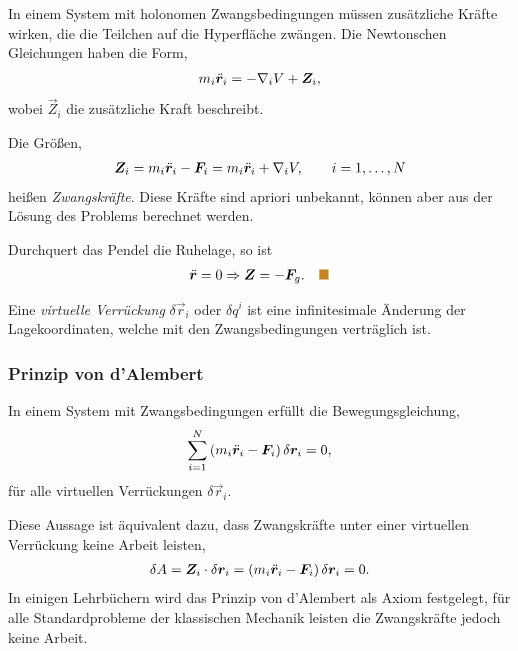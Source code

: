 \begin{bemn}
In einem System mit holonomen Zwangsbedingungen müssen zusätzliche Kräfte
wirken, die die Teilchen auf die Hyperfläche zwängen. Die Newtonschen Gleichungen haben die
Form,
\begin{align*}
m_i \ddot{\bm{r}}_i = -\nabla_i V + \bm{Z}_i,
\end{align*}
wobei $\vec{Z}_i$ die zusätzliche Kraft beschreibt.\maphere
\end{bemn}

\begin{defnn}
Die Größen,
\begin{align*}
\bm{Z}_i = m_i\ddot{\bm{r}}_i - \bm{F}_i = m_i\ddot{\bm{r}}_i + \nabla_i V,\qquad i =
1,\ldots,N
\end{align*}
heißen \emph{Zwangskräfte}. Diese Kräfte sind apriori unbekannt, können aber
aus der Lösung des Problems berechnet werden.\fishhere
\end{defnn}

\begin{bsp}
Durchquert das Pendel die Ruhelage, so ist
\begin{align*}
\ddvec{r} = 0 \Rightarrow \vec{Z} = -\vec{F}_g.\bsphere
\end{align*}
\end{bsp}

\begin{defnn}
Eine \emph{virtuelle Verrückung} $\delta \vec{r}_i$ oder $\delta q^i$ ist eine
infinitesimale Änderung der Lagekoordinaten, welche mit den Zwangsbedingungen
verträglich ist.\fishhere
\end{defnn}

\subsubsection{Prinzip von d'Alembert}
\begin{propn}
In einem System mit Zwangsbedingungen erfüllt die Bewegungsgleichung,
\begin{align*}
\sum\limits_{i=1}^N \left(m_i\ddot{\bm{r}}_i - \bm{F}_i \right)\delta\bm{r}_i = 0,
\end{align*}
für alle virtuellen Verrückungen $\delta\vec{r}_i$.\fishhere
\end{propn}

Diese Aussage ist äquivalent dazu, dass Zwangskräfte unter einer virtuellen
Verrückung keine Arbeit leisten,
\begin{align*}
\delta A = \bm{Z}_i \cdot \delta\bm{r}_i = \left(m_i\ddot{\bm{r}}_i -
\bm{F}_i\right) \delta\bm{r}_i = 0.
\end{align*}
In einigen Lehrbüchern wird das Prinzip von d'Alembert als Axiom festgelegt,
für alle Standardprobleme der klassischen Mechanik leisten die Zwangskräfte
jedoch keine Arbeit.

